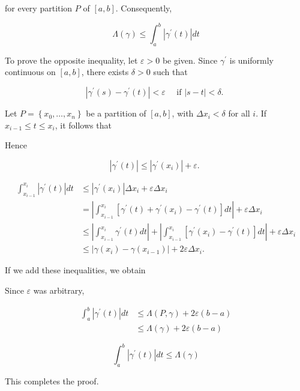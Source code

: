 \documentclass[10pt]{article}
\begin{document}
for every partition $P$ of $[a, b]$. Consequently,

$$
\Lambda(\gamma) \leq \int_{a}^{b}\left|\gamma^{\prime}(t)\right| d t
$$

To prove the opposite inequality, let $\varepsilon>0$ be given. Since $\gamma^{\prime}$ is uniformly continuous on $[a, b]$, there exists $\delta>0$ such that

$$
\left|\gamma^{\prime}(s)-\gamma^{\prime}(t)\right|<\varepsilon \quad \text { if }|s-t|<\delta \text {. }
$$

Let $P=\left\{x_{0}, \ldots, x_{n}\right\}$ be a partition of $[a, b]$, with $\Delta x_{i}<\delta$ for all $i$. If $x_{i-1} \leq t \leq x_{i}$, it follows that

Hence

$$
\left|\gamma^{\prime}(t)\right| \leq\left|\gamma^{\prime}\left(x_{i}\right)\right|+\varepsilon \text {. }
$$

$$
\begin{aligned}
\int_{x_{i-1}}^{x_{i}}\left|\gamma^{\prime}(t)\right| d t & \leq\left|\gamma^{\prime}\left(x_{i}\right)\right| \Delta x_{i}+\varepsilon \Delta x_{i} \\
& =\left|\int_{x_{i-1}}^{x_{i}}\left[\gamma^{\prime}(t)+\gamma^{\prime}\left(x_{i}\right)-\gamma^{\prime}(t)\right] d t\right|+\varepsilon \Delta x_{i} \\
& \leq\left|\int_{x_{i-1}}^{x_{i}} \gamma^{\prime}(t) d t\right|+\left|\int_{x_{i-1}}^{x_{i}}\left[\gamma^{\prime}\left(x_{i}\right)-\gamma^{\prime}(t)\right] d t\right|+\varepsilon \Delta x_{i} \\
& \leq\left|\gamma\left(x_{i}\right)-\gamma\left(x_{i-1}\right)\right|+2 \varepsilon \Delta x_{i} .
\end{aligned}
$$

If we add these inequalities, we obtain

Since $\varepsilon$ was arbitrary,

$$
\begin{aligned}
\int_{a}^{b}\left|\gamma^{\prime}(t)\right| d t & \leq \Lambda(P, \gamma)+2 \varepsilon(b-a) \\
& \leq \Lambda(\gamma)+2 \varepsilon(b-a)
\end{aligned}
$$

$$
\int_{a}^{b}\left|\gamma^{\prime}(t)\right| d t \leq \Lambda(\gamma)
$$

This completes the proof.
\end{document}
